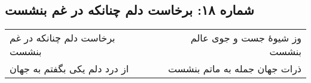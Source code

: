 \begin{center}
\section*{شماره ۱۸: برخاست دلم چنانکه در غم بنشست}
\label{sec:018}
\begin{longtable}{l p{0.5cm} r}
برخاست دلم چنانکه در غم بنشست
&&
وز شیوهٔ جست و جوی عالم بنشست
\\
از درد دلم یکی بگفتم به جهان
&&
ذرات جهان جمله به ماتم بنشست
\\
\end{longtable}
\end{center}
